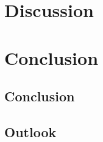 \documentclass[a4paper, 10pt]{article}
\begin{document}
	\section{Discussion}
	
	\section{Conclusion}
	
	\subsection{Conclusion}
	
	\subsection{Outlook}
	
	
\end{document}
